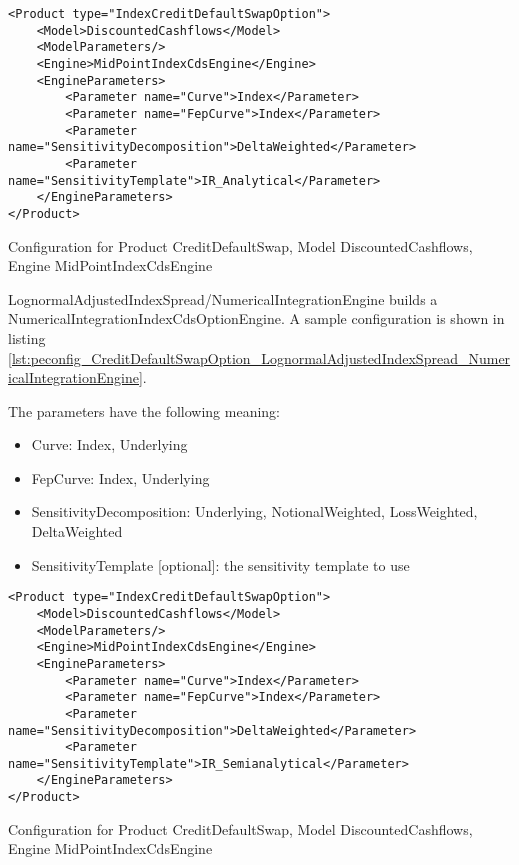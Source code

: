 \begin{longlisting}
\begin{verbatim}
<Product type="IndexCreditDefaultSwapOption">
    <Model>DiscountedCashflows</Model>
    <ModelParameters/>
    <Engine>MidPointIndexCdsEngine</Engine>
    <EngineParameters>
        <Parameter name="Curve">Index</Parameter>
        <Parameter name="FepCurve">Index</Parameter>
        <Parameter name="SensitivityDecomposition">DeltaWeighted</Parameter>
        <Parameter name="SensitivityTemplate">IR_Analytical</Parameter>
    </EngineParameters>
</Product>
\end{verbatim}
\caption{Configuration for Product CreditDefaultSwap, Model DiscountedCashflows, Engine MidPointIndexCdsEngine}
\label{lst:peconfig_CreditDefaultSwapOption_Black_BlackIndexCdsOptionEngine}
\end{longlisting}

LognormalAdjustedIndexSpread/NumericalIntegrationEngine builds a NumericalIntegrationIndexCdsOptionEngine. A sample
configuration is shown in listing
\ref{lst:peconfig_CreditDefaultSwapOption_LognormalAdjustedIndexSpread_NumericalIntegrationEngine}.

The parameters have the following meaning:

\begin{itemize}
\item Curve: Index, Underlying
\item FepCurve: Index, Underlying
\item SensitivityDecomposition: Underlying, NotionalWeighted, LossWeighted, DeltaWeighted
\item SensitivityTemplate [optional]: the sensitivity template to use 
\end{itemize}

\begin{longlisting}
\begin{verbatim}
<Product type="IndexCreditDefaultSwapOption">
    <Model>DiscountedCashflows</Model>
    <ModelParameters/>
    <Engine>MidPointIndexCdsEngine</Engine>
    <EngineParameters>
        <Parameter name="Curve">Index</Parameter>
        <Parameter name="FepCurve">Index</Parameter>
        <Parameter name="SensitivityDecomposition">DeltaWeighted</Parameter>
        <Parameter name="SensitivityTemplate">IR_Semianalytical</Parameter>
    </EngineParameters>
</Product>
\end{verbatim}
\caption{Configuration for Product CreditDefaultSwap, Model DiscountedCashflows, Engine MidPointIndexCdsEngine}
\label{lst:peconfig_CreditDefaultSwapOption_LognormalAdjustedIndexSpread_NumericalIntegrationEngine}
\end{longlisting}

